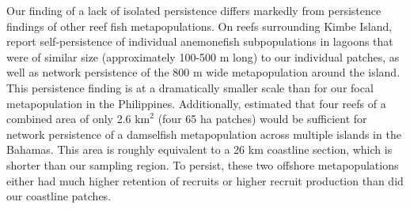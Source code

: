 \documentclass[12pt, oneside]{article}   	%
\begin{document}

Our finding of a lack of isolated persistence differs markedly from persistence findings of other reef fish metapopulations. On reefs surrounding Kimbe Island, \cite{salles_coral_2015} report self-persistence of individual anemonefish subpopulations in lagoons that were of similar size (approximately 100-500 m long) to our individual patches, as well as network persistence of the 800 m wide metapopulation around the island. This persistence finding is at a dramatically smaller scale than for our focal metapopulation in the Philippines. Additionally, \cite{johnson2018integrating} estimated that four reefs of a combined area of only 2.6 $\text{km}^2$ (four 65 ha patches) would be sufficient for network persistence of a damselfish metapopulation across multiple islands in the Bahamas. This area is roughly equivalent to a 26 km coastline section, which is shorter than our sampling region. To persist, these two offshore metapopulations either had much higher retention of recruits or higher recruit production than did our coastline patches. 
\end{document}
